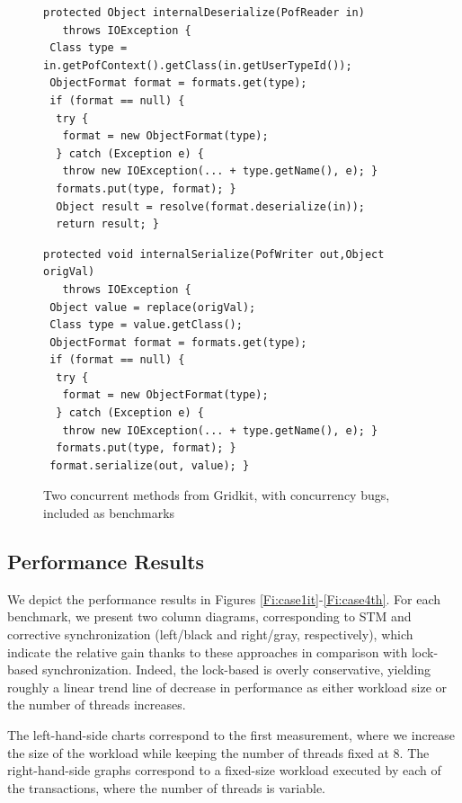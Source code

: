 \begin{figure}
	\begin{lstlisting}
protected Object internalDeserialize(PofReader in) 
   throws IOException {
 Class type = in.getPofContext().getClass(in.getUserTypeId());
 ObjectFormat format = formats.get(type);
 if (format == null) {
  try {
   format = new ObjectFormat(type);
  } catch (Exception e) {
   throw new IOException(... + type.getName(), e); }
  formats.put(type, format); }
  Object result = resolve(format.deserialize(in));
  return result; }
	\end{lstlisting}

	\begin{lstlisting}
protected void internalSerialize(PofWriter out,Object origVal) 
   throws IOException {
 Object value = replace(origVal);
 Class type = value.getClass();
 ObjectFormat format = formats.get(type);
 if (format == null) {
  try {
   format = new ObjectFormat(type);
  } catch (Exception e) {
   throw new IOException(... + type.getName(), e); }
  formats.put(type, format); }
 format.serialize(out, value); }
	\end{lstlisting}
	\caption{\label{Fi:gridkitPair}Two concurrent methods from Gridkit, with concurrency bugs, included as benchmarks}
\end{figure}

\subsection{Performance Results} 

We depict the performance results in Figures \ref{Fi:case1it}-\ref{Fi:case4th}. 
For each benchmark, we present two column diagrams, corresponding to STM and corrective synchronization (left/black and right/gray, respectively), which indicate the relative gain thanks to these approaches in comparison with lock-based synchronization. Indeed, the lock-based is overly conservative, yielding roughly a linear trend line of decrease in performance as either workload size or the number of threads increases.

The left-hand-side charts correspond to the first measurement, where we increase the size of the workload while keeping the number of threads fixed at 8. The right-hand-side graphs correspond to a fixed-size workload executed by each of the transactions, where the number of threads is variable.

